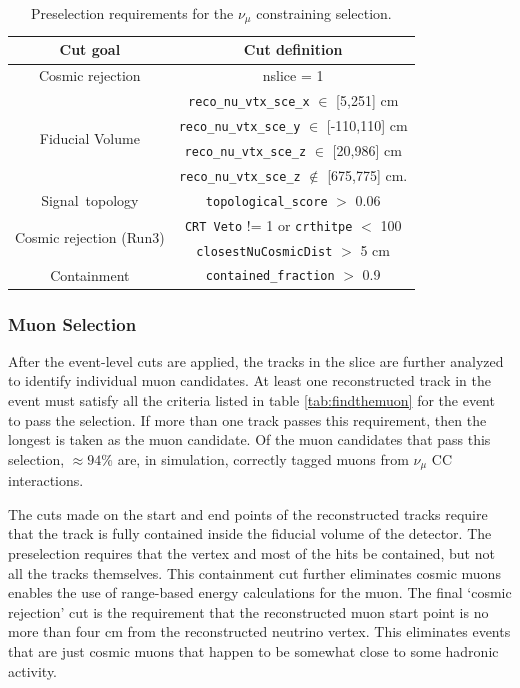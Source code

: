 \begin{table}[h!]
\centering
\setlength{\tabcolsep}{10pt}
\renewcommand{\arraystretch}{1.25}
 \begin{tabular}{| c | c |} 
 \hline
 Cut goal & Cut definition \\
 \hline\hline
 \multirow{1}{*}{ Cosmic rejection } & nslice = 1 \\
 \hline
 \multirow{4}{*}{Fiducial Volume} & \texttt{reco\_nu\_vtx\_sce\_x} $\in$ [5,251] cm \\ &
\texttt{reco\_nu\_vtx\_sce\_y} $\in$ [-110,110] cm \\ &
\texttt{reco\_nu\_vtx\_sce\_z} $\in$ [20,986] cm \\ &
\texttt{reco\_nu\_vtx\_sce\_z} $\not\in$ [675,775] cm.\\
\hline
\multirow{1}{*}{Signal~topology} & \texttt{topological\_score} $>$ 0.06 \\
 \hline
 \multirow{2}{*}{ Cosmic rejection (Run3) } & \texttt{CRT Veto} != 1 or \texttt{crthitpe} $<$ 100\\
& \texttt{closestNuCosmicDist} $>$ 5 cm\\
 \hline
Containment & \texttt{contained\_fraction} $>$ 0.9 \\
 \hline
 \end{tabular}
 \caption{\label{tab:numuCC:presel} Preselection requirements for the $\nu_\mu$ constraining selection.}
\end{table}


\subsubsection{Muon Selection}
\label{sssec:NuMUCCsel:constr:muonsel}

\par After the event-level cuts are applied, the tracks in the slice are further analyzed to identify individual muon candidates. At least one reconstructed track in the event must satisfy all the criteria listed in table \ref{tab:findthemuon} for the event to pass the selection. If more than one track passes this requirement, then the longest is taken as the muon candidate. Of the muon candidates that pass this selection, $\approx 94\%$ are, in simulation, correctly tagged muons from $\nu_{\mu}$ CC interactions.

\par The cuts made on the start and end points of the reconstructed tracks require that the track is fully contained inside the fiducial volume of the detector. The preselection requires that the vertex and most of the hits be contained, but not all the tracks themselves. This containment cut further eliminates cosmic muons enables the use of range-based energy calculations for the muon. The final `cosmic rejection' cut is the requirement that the reconstructed muon start point is no more than four cm from the reconstructed neutrino vertex. This eliminates events that are just cosmic muons that happen to be somewhat close to some hadronic activity. 


